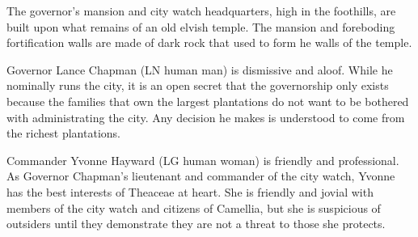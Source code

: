 The governor's mansion and city watch headquarters, high in the foothills, are built upon what remains of an old elvish temple.
The mansion and foreboding fortification walls are made of dark rock that used to form he walls of the temple.

Governor Lance Chapman (LN human man) is dismissive and aloof.
While he nominally runs the city, it is an open secret that the governorship only exists because the families that own the largest plantations do not want to be bothered with administrating the city.
Any decision he makes is understood to come from the richest plantations.

Commander Yvonne Hayward (LG human woman) is friendly and professional.
As Governor Chapman's lieutenant and commander of the city watch, Yvonne has the best interests of Theaceae at heart.
She is friendly and jovial with members of the city watch and citizens of Camellia, but she is suspicious of outsiders until they demonstrate they are not a threat to those she protects.
